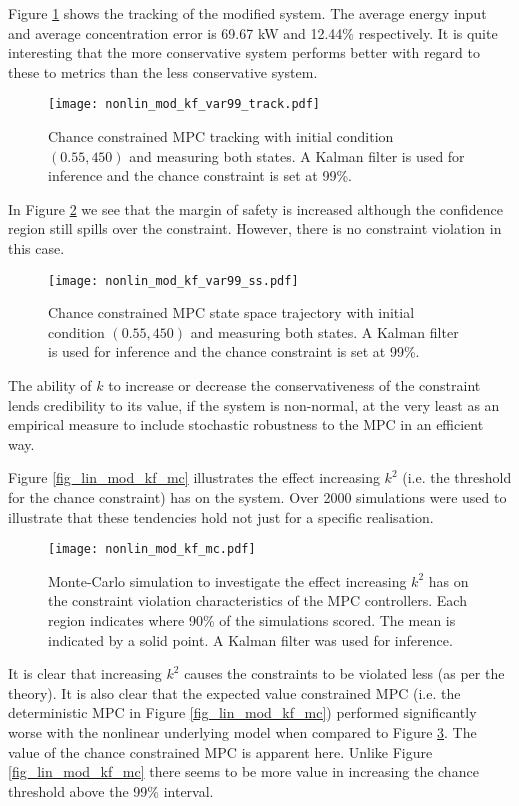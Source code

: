 Figure \ref{fig_nonlin_mod_kf_var99_track} shows the tracking of the modified system. The average energy input and average concentration error is 69.67 kW and 12.44\% respectively. It is quite interesting that the more conservative system performs better with regard to these to metrics than the less conservative system.
\begin{figure}[H] 
\centering
\texttt{[image: nonlin\_mod\_kf\_var99\_track.pdf]}
\caption{Chance constrained MPC tracking with initial condition $(0.55, 450)$ and measuring both states. A Kalman filter is used for inference and the chance constraint is set at 99\%.}
\label{fig_nonlin_mod_kf_var99_track}
\end{figure}
In Figure \ref{fig_nonlin_mod_kf_var99_ss} we see that the margin of safety is increased although the confidence region still spills over the constraint. However, there is no constraint violation in this case.
\begin{figure}[H] 
\centering
\texttt{[image: nonlin\_mod\_kf\_var99\_ss.pdf]}
\caption{Chance constrained MPC state space trajectory with initial condition $(0.55, 450)$ and measuring both states. A Kalman filter is used for inference and the chance constraint is set at 99\%.}
\label{fig_nonlin_mod_kf_var99_ss}
\end{figure}
The ability of $k$ to increase or decrease the conservativeness of the constraint lends credibility to its value, if the system is non-normal, at the very least as an empirical measure to include stochastic robustness to the MPC in an efficient way.

Figure \ref{fig_lin_mod_kf_mc} illustrates the effect increasing $k^2$ (i.e. the threshold for the chance constraint) has on the system. Over 2000 simulations were used to illustrate that these tendencies hold not just for a specific realisation. 
\begin{figure}[H] 
\centering
\texttt{[image: nonlin\_mod\_kf\_mc.pdf]}
\caption{Monte-Carlo simulation to investigate the effect increasing $k^2$ has on the constraint violation characteristics of the MPC controllers. Each region indicates where 90\% of the simulations scored. The mean is indicated by a solid point. A Kalman filter was used for inference.}
\label{fig_nonlin_mod_kf_mc}
\end{figure}
It is clear that increasing $k^2$ causes the constraints to be violated less (as per the theory). It is also clear that the expected value constrained MPC (i.e. the deterministic MPC in Figure \ref{fig_lin_mod_kf_mc}) performed significantly worse with the nonlinear underlying model when compared to Figure \ref{fig_nonlin_mod_kf_mc}. The value of the chance constrained MPC is apparent here. Unlike Figure \ref{fig_lin_mod_kf_mc} there seems to be more value in increasing the chance threshold above the 99\% interval.

